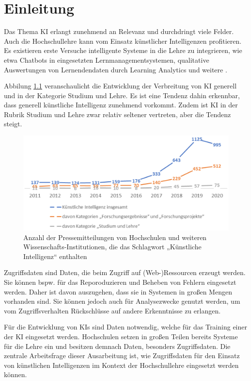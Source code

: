 \chapter{Einleitung}
Das Thema \ac{KI} erlangt zunehmend an Relevanz und durchdringt viele Felder. Auch die Hochschullehre kann vom Einsatz künstlicher Intelligenzen profitieren. Es existieren erste Versuche intelligente Systeme in die Lehre zu integrieren, wie etwa Chatbots in eingesetzten Lernmanagementsystemen, qualitative Auswertungen von Lernendendaten durch Learning Analytics und weitere \cite*[S. 18, S. 14ff.]{Witt.2020}.

Abbilung \ref*{fig:entwickling_ki} veranschaulicht die Entwicklung der Verbreitung von \ac{KI} generell und in der Kategorie \glqq Studium und Lehre\grqq. Es ist eine Tendenz dahin erkennbar, dass generell künstliche Intelligenz zunehmend vorkommt. Zudem ist KI in der Rubrik Studium und Lehre zwar relativ seltener vertreten, aber die Tendenz steigt.
\begin{figure}[hbtp]
    \centering
    \includegraphics[width=.8\textwidth]{figures/entwicklung_historie_ki.png}
    \caption{Anzahl der Pressemitteilungen von Hochschulen und weiteren Wissenschafts-Institutionen, die das Schlagwort „Künstliche Intelligenz“ enthalten \cite*[S. 9]{Wannemacher.2021}}
    \label{fig:entwickling_ki}
\end{figure}

Zugriffsdaten sind Daten, die beim Zugriff auf (Web-)Ressourcen erzeugt werden. Sie können bspw. für das Reporoduzieren und Beheben von Fehlern eingesetzt werden. Daher ist davon auszugehen, dass sie in Systemen in großen Mengen vorhanden sind. Sie können jedoch auch für Analysezwecke genutzt werden, um vom Zugriffsverhalten Rückschlüsse auf andere Erkenntnisse zu erlangen.

Für die Entwicklung von KIs sind Daten notwendig, welche für das Training einer der KI eingesetzt werden. Hochschulen setzen in großen Teilen bereits Systeme für die Lehre ein und besitzen demnach Daten, besonders Zugriffsdaten. Die zentrale Arbeitsfrage dieser Ausarbeitung ist, wie Zugriffsdaten für den Einsatz von künstlichen Intelligenzen im Kontext der Hochschullehre eingesetzt werden können.

